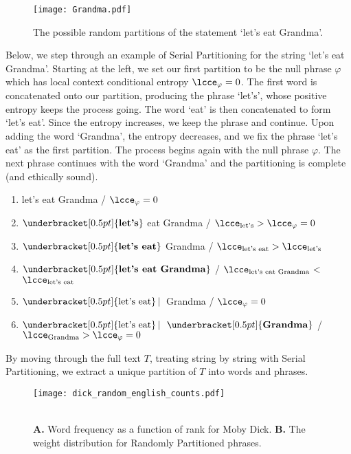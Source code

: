 \begin{figure}[tbp!]
  \centering
  \texttt{[image: Grandma.pdf]}
  \caption{
    The possible random partitions of the statement `let's eat Grandma'.
  }
  \label{fig:textpart.grandma}
\end{figure}


Below, we step through an example of Serial Partitioning for the string `let's eat Grandma'.
Starting at the left, we set our first partition to be the null phrase
$\varphi$ 
which has local context conditional entropy $\lcce_\varphi =  0$.
The first word is concatenated onto our partition, producing the phrase `let's',
whose positive entropy keeps the process going.
The word `eat' is then concatenated to form `let's eat'. 
Since the entropy increases, we keep the phrase and continue.
Upon adding the word `Grandma', the entropy decreases, 
and we fix the phrase `let's eat' as the first partition.
The process begins again with the null phrase $\varphi$.
The next phrase continues with the word `Grandma' and the partitioning
is complete (and ethically sound).
\begin{enumerate}
\item let's eat Grandma /  $\lcce_\varphi=0$
\item $\underbracket[0.5pt]{\textnormal{\textbf{let's}}}$ eat Grandma /  $\lcce_\text{let's}>\lcce_\varphi=0$
\item $\underbracket[0.5pt]{\textnormal{\textbf{let's eat}}}$ Grandma /  $\lcce_\text{let's eat}>\lcce_\text{let's}$
\item $\underbracket[0.5pt]{\textnormal{\textbf{let's eat Grandma}}}$ / $\lcce_\text{let's eat Grandma}$$<$$\lcce_\text{let's eat}$
\item $\underbracket[0.5pt]{\textnormal{let's eat}} \,|\,$ Grandma /  $\lcce_\varphi=0$
\item $\underbracket[0.5pt]{\textnormal{let's eat}} \,|\,$ $\underbracket[0.5pt]{\textnormal{\textbf{Grandma}}}$ / $\lcce_\text{Grandma}>\lcce_\varphi= 0$
\end{enumerate}
By moving through the full text $T$, treating string by string 
with Serial Partitioning, we extract a unique partition of $T$ into words and phrases.

\begin{figure*}[tbp!]
  \centering
  \texttt{[image: dick\_random\_english\_counts.pdf]}
  \caption{
    \\
    \textbf{A.} Word frequency as a function of rank for Moby Dick.
    \textbf{B.} The weight distribution for Randomly Partitioned phrases.
    }
  \label{fig:textpart.mobydick_randompart}
\end{figure*}

